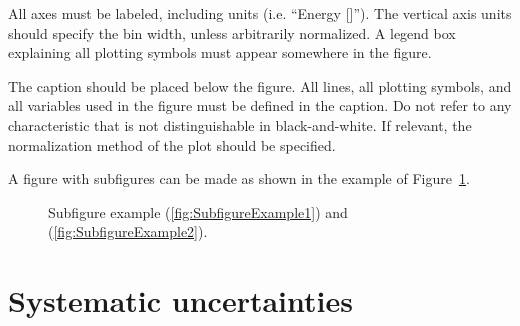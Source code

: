 \documentclass[11pt,a4paper]{../atlasnote}
\begin{document}
All axes must be labeled, including units (i.e. ``Energy [\gev]'').
The vertical axis units should specify the bin width, unless
arbitrarily normalized. A legend box explaining all plotting symbols
must appear somewhere in the figure.

The caption should be placed below the figure.  All lines, all
plotting symbols, and all variables used in the figure must be defined
in the caption. Do not refer to any characteristic that is not
distinguishable in black-and-white.  If relevant, the normalization
method of the plot should be specified.

A figure with subfigures can be made as shown in the example of
Figure~\ref{fig:subfigexample}.

\begin{figure}
  \centering
  \caption{Subfigure example (\ref{fig:SubfigureExample1}) and
    (\ref{fig:SubfigureExample2}).}
  \label{fig:subfigexample}
\end{figure}

%
%
\section{Systematic uncertainties}
\end{document}
